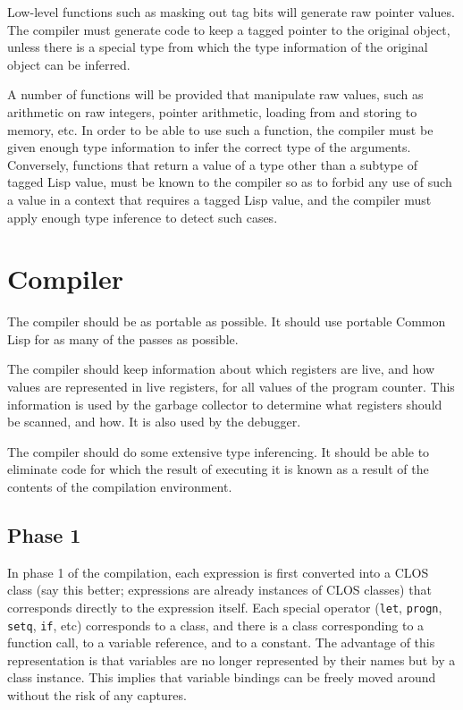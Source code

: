 \documentclass{article}
\begin{document}
Low-level functions such as masking out tag bits will generate raw
pointer values.  The compiler must generate code to keep a tagged
pointer to the original object, unless there is a special type from
which the type information of the original object can be inferred. 

A number of functions will be provided that manipulate raw values,
such as arithmetic on raw integers, pointer arithmetic, loading from
and storing to memory, etc.  In order to be able to use such a
function, the compiler must be given enough type information to infer
the correct type of the arguments.  Conversely, functions that return
a value of a type other than a subtype of tagged Lisp value, must be
known to the compiler so as to forbid any use of such a value in a
context that requires a tagged Lisp value, and the compiler must
apply enough type inference to detect such cases. 

\section{Compiler}

The compiler should be as portable as possible.  It should use
portable Common Lisp for as many of the passes as possible.  

The compiler should keep information about which registers are live,
and how values are represented in live registers, for all values of
the program counter.  This information is used by the garbage
collector to determine what registers should be scanned, and how.   It
is also used by the debugger.  

The compiler should do some extensive type inferencing.  It should be
able to eliminate code for which the result of executing it is known
as a result of the contents of the compilation environment.  

\subsection{Phase 1}

In phase 1 of the compilation, each expression is first converted into
a CLOS class (say this better; expressions are already instances of
CLOS classes) that corresponds directly to the expression itself.  
Each special operator (\texttt{let}, \texttt{progn}, \texttt{setq},
\texttt{if}, etc) corresponds to a class, and there is a class
corresponding to a function call, to a variable reference, and to a
constant.  The advantage of this representation is that variables are
no longer represented by their names but by a class instance.  This
implies that variable bindings can be freely moved around without the
risk of any captures.  
\end{document}
